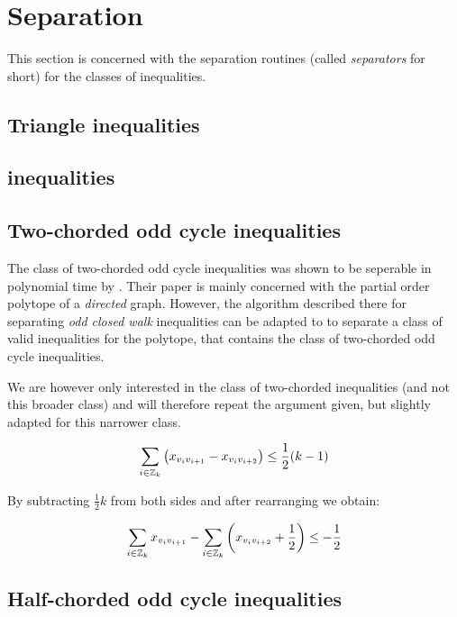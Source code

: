 \section{Separation}\label{sec:separation}
This section is concerned with the separation routines (called \textit{separators} for short) for the classes of inequalities.

\subsection{Triangle inequalities}\label{subsec:triangle_separator}

\subsection{\texorpdfstring{\ST}{[S:T]} inequalities}\label{subsec:st_separator}

\subsection{Two-chorded odd cycle inequalities}\label{subsec:two_chorded_separator}
The class of two-chorded odd cycle inequalities was shown to be seperable in polynomial time by \cite{mullerPartialOrderPolytope1996}.
Their paper is mainly concerned with the partial order polytope of a \textit{directed} graph.
However, the algorithm described there for separating \textit{odd closed walk} inequalities can be adapted to to separate a class of valid inequalities for the \CP polytope, that contains the class of two-chorded odd cycle inequalities.

We are however only interested in the class of two-chorded inequalities (and not this broader class) and will therefore repeat the argument given, but slightly adapted for this narrower class.

\begin{equation*}
	\sum_{i \in \mathbb{Z}_k} \left( x_{v_i v_{i+1}} - x_{v_i v_{i+2}} \right) \leq \frac{1}{2} (k-1)
\end{equation*}

By subtracting $\frac{1}{2}k$ from both sides and after rearranging we obtain:

\begin{equation*}
	\sum_{i \in \mathbb{Z}_k} x_{v_i v_{i+1}} - \sum_{i \in \mathbb{Z}_k} \left(x_{v_i v_{i+2}} + \frac{1}{2} \right) \leq -\frac{1}{2}
\end{equation*}

\subsection{Half-chorded odd cycle inequalities}\label{subsec:half_chorded_separator}

